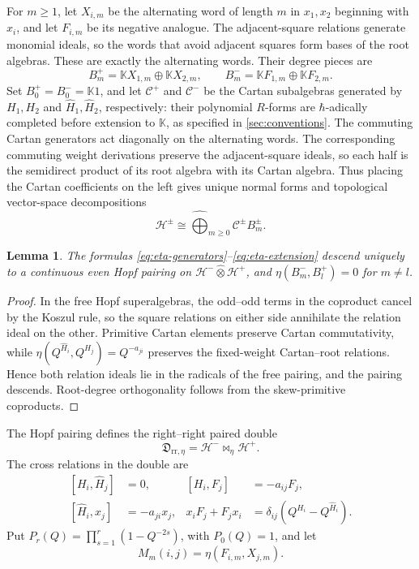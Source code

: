 \documentclass[11pt,a4paper]{article}
\newcommand{\hK}{\mathbb K}
\newcommand{\hot}{\widehat\otimes}
\newtheorem{lemma}[theorem]{Lemma}
\theoremstyle{definition}
\theoremstyle{remark}
\begin{document}
For \(m\geq1\), let \(X_{i,m}\) be the alternating word of length \(m\)
in \(x_1,x_2\) beginning with \(x_i\), and let \(F_{i,m}\) be its
negative analogue.  The adjacent-square relations generate monomial
ideals, so the words that avoid adjacent squares form bases of the root
algebras.  These are exactly the alternating words.  Their degree pieces
are
\[
 B_m^+=\hK X_{1,m}\oplus\hK X_{2,m},\qquad
 B_m^-=\hK F_{1,m}\oplus\hK F_{2,m}.
\]
Set \(B_0^+=B_0^-=\hK1\), and let \(\mathcal C^+\) and
\(\mathcal C^-\) be the Cartan subalgebras generated by
\(H_1,H_2\) and \(\widehat H_1,\widehat H_2\), respectively:
their polynomial \(R\)-forms are \(\hbar\)-adically completed before
extension to \(\hK\), as specified in \cref{sec:conventions}.
The commuting Cartan generators act diagonally on the alternating
words.  The corresponding commuting weight derivations preserve the
adjacent-square ideals, so each half is the semidirect product of its
root algebra with its Cartan algebra.  Thus placing the Cartan
coefficients on the left gives unique normal forms and topological
vector-space decompositions
\[
 \mathcal H^\pm
 \cong\widehat{\bigoplus}_{m\geq0}\mathcal C^\pm B_m^\pm.
\]

\begin{lemma}\label{lem:pairing-descends}
The formulas \eqref{eq:eta-generators}--\eqref{eq:eta-extension} descend
uniquely to a continuous even Hopf pairing on
\(\mathcal H^-\hot\mathcal H^+\), and
\(\eta(B_m^-,B_l^+)=0\) for \(m\neq l\).
\end{lemma}

\begin{proof}
In the free Hopf superalgebras, the odd--odd terms in the coproduct cancel
by the Koszul rule, so the square relations on either side annihilate the
relation ideal on the other.  Primitive Cartan elements preserve Cartan
commutativity, while
\(\eta(Q^{\widehat H_i},Q^{H_j})=Q^{-a_{ji}}\) preserves the fixed-weight
Cartan--root relations.  Hence both relation ideals lie in the radicals
of the free pairing, and the pairing descends.  Root-degree orthogonality
follows from the skew-primitive coproducts.
\end{proof}

The Hopf pairing defines the right--right paired double
\[
 \mathfrak D_{\mathrm{rr},\eta}=\mathcal H^-\bowtie_\eta\mathcal H^+.
\]
The cross relations in the double are
\begin{equation}\label{eq:double-cross}
\begin{aligned}
 [H_i,\widehat H_j]&=0,&
 [H_i,F_j]&=-a_{ij}F_j,\\
 [\widehat H_i,x_j]&=-a_{ji}x_j,&
 x_iF_j+F_jx_i&=\delta_{ij}(Q^{H_i}-Q^{\widehat H_i}).
\end{aligned}
\end{equation}
Put \(P_r(Q)=\prod_{s=1}^r(1-Q^{-2s})\), with \(P_0(Q)=1\), and let
\[
 M_m(i,j)=\eta(F_{i,m},X_{j,m}).
\]
\end{document}
